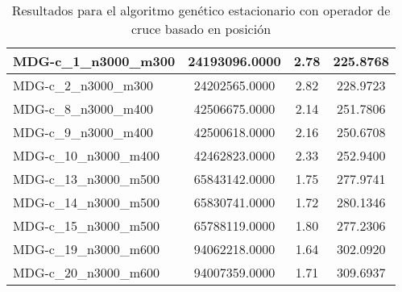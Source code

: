 \documentclass[10pt,a4paper]{article}
\begin{document}
\begin{table}[H]
\begin{center}
\begin{tabular}{|l|c|c|c|}
		MDG-c\_1\_n3000\_m300 & 24193096.0000 & 2.78 & 225.8768 \\ \hline
		MDG-c\_2\_n3000\_m300 & 24202565.0000 & 2.82 & 228.9723 \\ \hline
		MDG-c\_8\_n3000\_m400 & 42506675.0000 & 2.14 & 251.7806 \\ \hline
		MDG-c\_9\_n3000\_m400 & 42500618.0000 & 2.16 & 250.6708 \\ \hline
		MDG-c\_10\_n3000\_m400 & 42462823.0000 & 2.33 & 252.9400 \\ \hline
		MDG-c\_13\_n3000\_m500 & 65843142.0000 & 1.75 & 277.9741 \\ \hline
		MDG-c\_14\_n3000\_m500 & 65830741.0000 & 1.72 & 280.1346 \\ \hline
		MDG-c\_15\_n3000\_m500 & 65788119.0000 & 1.80 & 277.2306 \\ \hline
		MDG-c\_19\_n3000\_m600 & 94062218.0000 & 1.64 & 302.0920 \\ \hline
		MDG-c\_20\_n3000\_m600 & 94007359.0000 & 1.71 & 309.6937 \\ \hline
	\end{tabular}
	\caption{Resultados para el algoritmo genético estacionario con operador de cruce basado en posición}
	\label{}
	\end{center}
\end{table}

\newpage
\end{document}
